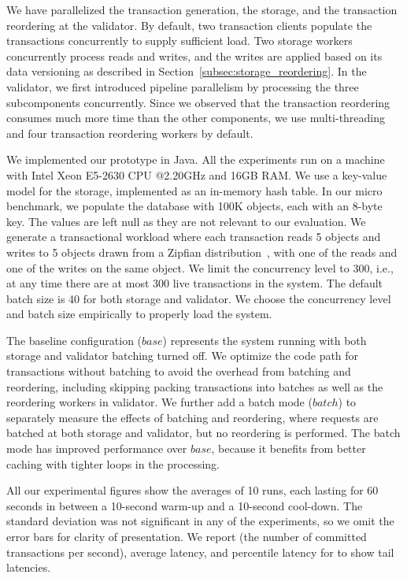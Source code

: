 We have parallelized the transaction generation, the storage, and the transaction reordering at the validator. By default, two transaction clients populate the transactions concurrently to supply sufficient load. Two storage workers concurrently process reads and writes, 
and the writes are applied based on its data versioning as described in Section~\ref{subsec:storage_reordering}. 
In the validator, we first introduced pipeline parallelism by processing the three subcomponents concurrently. Since we observed that the transaction reordering consumes much more time than the other components, we use multi-threading and four transaction reordering workers by default.

We implemented our prototype in Java. All the experiments run on a machine with
Intel Xeon E5-2630 CPU @2.20GHz and 16GB RAM. We use a key-value model for the
storage, implemented as an in-memory hash table. In our micro benchmark, we populate the database with 100K objects, each with an 8-byte key. The values are left null as they are not relevant to our evaluation. We generate a transactional workload where each transaction reads 5 objects and writes to 5 objects drawn from a Zipfian distribution~\cite{gray1994quickly}, with one of the reads and one of the writes on the same object. We limit the concurrency level to 300, i.e., at any time there are at most 300 live transactions in the system. The default batch size is 40 for both storage and validator. We choose the concurrency level and batch size empirically to properly load the system.

The baseline configuration ($base$) represents the system running with both storage and validator batching turned off. We optimize the code path for transactions without batching to avoid the overhead from batching and reordering, including skipping packing transactions into batches as well as the reordering workers in validator. We further add a batch mode ($batch$) to separately measure the effects of batching and reordering, where requests are batched at both storage and validator, but no reordering is performed. The batch mode has improved performance over $base$, because it benefits from better caching with tighter loops in the processing. 

All our experimental figures show the averages of 10 runs, each lasting for 60 seconds in between a 10-second warm-up and a 10-second cool-down. The standard deviation was not significant in any of the experiments, so we omit the error bars for clarity of presentation. We report  (the number of committed transactions per second), average latency, and percentile latency for to show tail latencies.

